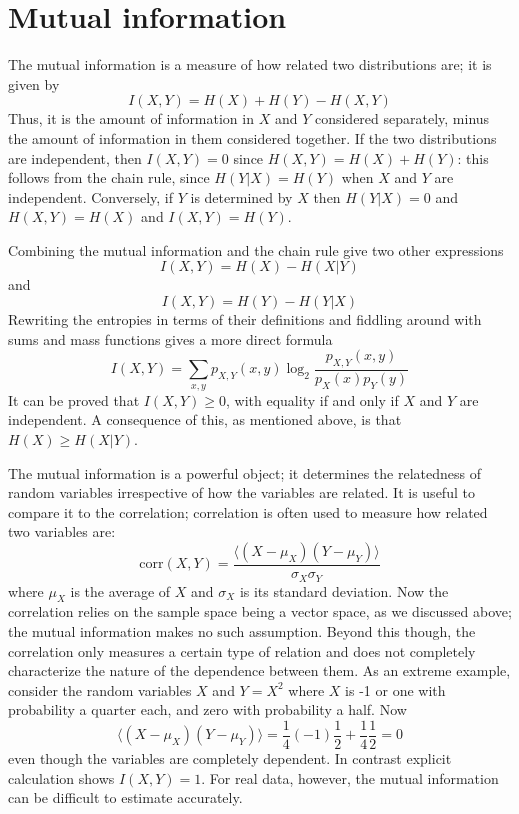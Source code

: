 \documentclass[12pt]{article}
\begin{document}
\section*{Mutual information}

The mutual information is a measure of how related two distributions are; it is given by
\begin{equation}
I(X,Y)=H(X)+H(Y)-H(X,Y)
\end{equation}
Thus, it is the amount of information in $X$ and $Y$ considered
separately, minus the amount of information in them considered
together. If the two distributions are independent, then $I(X,Y)=0$
since $H(X,Y)=H(X)+H(Y)$: this follows from the chain rule, since
$H(Y|X)=H(Y)$ when $X$ and $Y$ are independent. Conversely, if $Y$ is
determined by $X$ then $H(Y|X)=0$ and $H(X,Y)=H(X)$ and $I(X,Y)=H(Y)$.

Combining the mutual information and the chain rule give two other expressions
\begin{equation}
I(X,Y)=H(X)-H(X|Y)
\end{equation}
and 
\begin{equation}
I(X,Y)=H(Y)-H(Y|X)
\end{equation}
Rewriting the entropies in terms of their definitions and fiddling
around with sums and mass functions gives a more direct formula
\begin{equation}
I(X,Y)=\sum_{x,y}p_{X,Y}(x,y)\log_2\frac{p_{X,Y}(x,y)}{p_X(x)p_Y(y)}
\end{equation}
It can be proved that $I(X,Y)\ge 0$, with equality if and only if $X$
and $Y$ are independent. A consequence of this, as mentioned above, is
that $H(X)\ge H(X|Y)$.

The mutual information is a powerful object; it determines the
relatedness of random variables irrespective of how the variables are
related. It is useful to compare it to the correlation; correlation is
often used to measure how related two variables are:
\begin{equation}
\mbox{corr}(X,Y)=\frac{\langle (X-\mu_X)(Y-\mu_Y)\rangle}{\sigma_X\sigma_Y}
\end{equation}
where $\mu_X$ is the average of $X$ and $\sigma_X$ is its standard
deviation. Now the correlation relies on the sample space being a
vector space, as we discussed above; the mutual information makes no
such assumption. Beyond this though, the correlation only measures a
certain type of relation and does not completely characterize the
nature of the dependence between them. As an extreme example, consider
the random variables $X$ and $Y=X^2$ where $X$ is -1 or one with
probability a quarter each, and zero with probability a half. Now 
\begin{equation}
\langle (X-\mu_X)(Y-\mu_Y)\rangle=\frac{1}{4}(-1)\frac{1}{2}+\frac{1}{4}\frac{1}{2}=0
\end{equation}
even though the variables are completely dependent. In contrast
explicit calculation shows $I(X,Y)=1$. For real data, however, the
mutual information can be difficult to estimate accurately.
\end{document}
